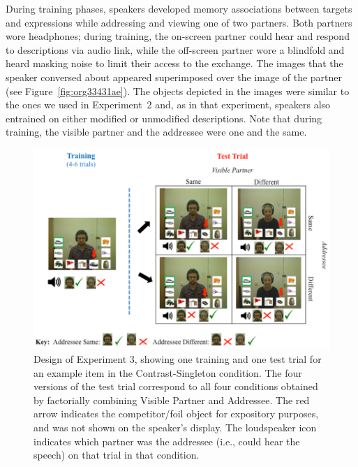 \documentclass[natbib,doc,a4paper]{apa6}
\begin{document}
During training phases, speakers developed memory associations between targets and expressions while addressing and viewing one of two partners. Both partners wore headphones; during training, the on-screen partner could hear and respond to descriptions via audio link, while the off-screen partner wore a blindfold and heard masking noise to limit their access to the exchange.  The images that the speaker conversed about appeared superimposed over the image of the partner (see Figure~\ref{fig:org33431ae}). The objects depicted in the images were similar to the ones we used in Experiment~2 and, as in that experiment, speakers also entrained on either modified or unmodified descriptions. Note that during training, the visible partner and the addressee were one and the same.

\begin{figure}[htbp]
\centering
\includegraphics[width=.9\linewidth]{figs/Exp3_overview.png}
\caption{\label{fig:orgb3dc76f}
Design of Experiment 3, showing one training and one test trial for an example item in the Contrast-Singleton condition. The four versions of the test trial correspond to all four conditions obtained by factorially combining Visible Partner and Addressee. The red arrow indicates the competitor/foil object for expository purposes, and was not shown on the speaker's display.  The loudspeaker icon indicates which partner was the addressee (i.e., could hear the speech) on that trial in that condition.}
\end{figure}
\end{document}

